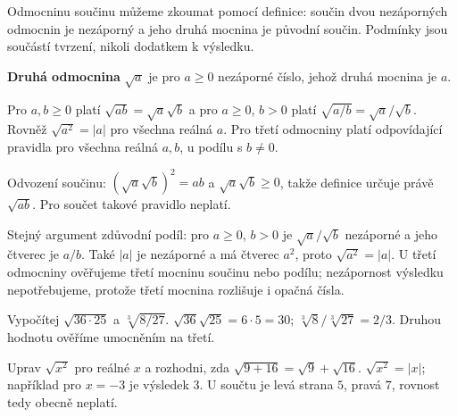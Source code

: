 \documentclass[11pt,a4paper]{article}
\begin{document}

Odmocninu součinu můžeme zkoumat pomocí definice: součin dvou nezáporných odmocnin je nezáporný a jeho druhá mocnina je původní součin. Podmínky jsou součástí tvrzení, nikoli dodatkem k výsledku.

\begin{definiceBox}[title={Připomenutí definice},breakable=false]
\textbf{Druhá odmocnina} $\sqrt a$ je pro $a\ge0$ nezáporné číslo, jehož druhá mocnina je $a$.
\end{definiceBox}


Pro $a,b\ge0$ platí $\sqrt{ab}=\sqrt a\sqrt b$ a pro $a\ge0$, $b>0$ platí $\sqrt{a/b}=\sqrt a/\sqrt b$. Rovněž $\sqrt{a^2}=|a|$ pro všechna reálná $a$. Pro třetí odmocniny platí odpovídající pravidla pro všechna reálná $a,b$, u podílu s $b\ne0$.

Odvození součinu: $(\sqrt a\sqrt b)^2=ab$ a $\sqrt a\sqrt b\ge0$, takže definice určuje právě $\sqrt{ab}$. Pro součet takové pravidlo neplatí.

Stejný argument zdůvodní podíl: pro $a\ge0$, $b>0$ je
$\sqrt a/\sqrt b$ nezáporné a jeho čtverec je $a/b$.
Také $|a|$ je nezáporné a má čtverec $a^2$, proto $\sqrt{a^2}=|a|$.
U třetí odmocniny ověřujeme třetí mocninu součinu nebo podílu;
nezápornost výsledku nepotřebujeme, protože třetí mocnina
rozlišuje i opačná čísla.


\begin{prikladReseniBox}[title={Příklad 1},breakable=false]
Vypočítej $\sqrt{36\cdot25}$ a $\sqrt[3]{8/27}$.
\tcblower
$\sqrt{36}\sqrt{25}=6\cdot5=30$; $\sqrt[3]8/\sqrt[3]{27}=2/3$. Druhou hodnotu ověříme umocněním na třetí.
\end{prikladReseniBox}


\begin{prikladReseniBox}[title={Příklad 2},breakable=false]
Uprav $\sqrt{x^2}$ pro reálné $x$ a rozhodni, zda $\sqrt{9+16}=\sqrt9+\sqrt{16}$.
\tcblower
$\sqrt{x^2}=|x|$; například pro $x=-3$ je výsledek $3$. U součtu je levá strana $5$, pravá $7$, rovnost tedy obecně neplatí.
\end{prikladReseniBox}


\end{document}
